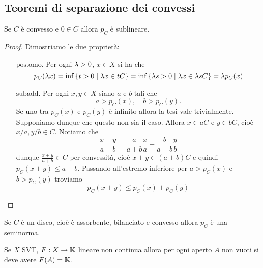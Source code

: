 \subsection{Teoremi di separazione dei convessi}

\begin{proposition}\label{PrFunzionaliMinkowskiSonoSublineari}
Se $C$ \`e convesso e $0\in C$ allora $p_C$ \`e sublineare.
\end{proposition}
\begin{proof}
Dimostriamo le due propriet\`a:
\setlength{\leftmargini}{0cm}
\begin{itemize}
    \item[$\boxed{\text{pos.omo.}}$] Per ogni $\lambda>0$, $x\in X$ si ha che
    \[p_C(\lambda x)=\inf\left\{{t>0\mid \lambda x\in tC}\right\}=\inf\left\{{\lambda s>0\mid \lambda x\in\lambda sC}\right\}=\lambda p_C(x)\]
    \item[$\boxed{\text{subadd.}}$] Per ogni $x,y\in X$ siano $a$ e $b$ tali che
    \[a>p_C(x),\quad b>p_C(y).\]
    Se uno tra $p_C(x)$ e $p_C(y)$ \`e infinito allora la tesi vale trivialmente. Supponiamo dunque che questo non sia il caso.
    Allora $x\in aC$ e $y\in bC$, cio\`e $x/a,y/b\in C$. Notiamo che
    \[\frac{x+y}{a+b}=\frac a{a+b}\frac xa+\frac b{a+b}\frac yb\]
    dunque $\frac{x+y}{a+b}\in C$ per convessit\`a, cio\`e $x+y\in (a+b)C$ e quindi $p_C(x+y)\leq a+b$. Passando all'estremo inferiore per $a>p_C(x)$ e $b>p_C(y)$ troviamo
    \[p_C(x+y)\leq p_C(x)+p_C(y)\]
\end{itemize}
\setlength{\leftmargini}{0.5cm}
\end{proof}


\begin{remark}
    Se $C$ \`e un disco, cio\`e \`e assorbente, bilanciato e  convesso allora $p_C$ \`e una seminorma.
\end{remark}

\begin{exercise}
Se $X$ SVT, $F:X\to \mathbb{K}$ lineare non continua allora per ogni aperto $A$ non vuoti si deve avere $F(A)=\mathbb{K}$.
\end{exercise}

